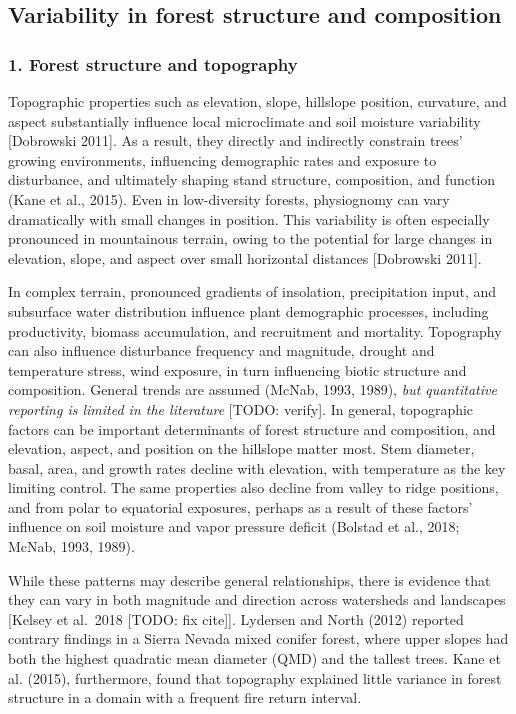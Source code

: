 \documentclass[
  12pt,
]{article}
\begin{document}
\hypertarget{variability-in-forest-structure-and-composition}{%
\subsection{Variability in forest structure and
composition}\label{variability-in-forest-structure-and-composition}}

\hypertarget{forest-structure-and-topography}{%
\subsubsection{1. Forest structure and
topography}\label{forest-structure-and-topography}}

Topographic properties such as elevation, slope, hillslope position,
curvature, and aspect substantially influence local microclimate and
soil moisture variability {[}Dobrowski 2011{]}. As a result, they
directly and indirectly constrain trees' growing environments,
influencing demographic rates and exposure to disturbance, and
ultimately shaping stand structure, composition, and function (Kane et
al., 2015). Even in low-diversity forests, physiognomy can vary
dramatically with small changes in position. This variability is often
especially pronounced in mountainous terrain, owing to the potential for
large changes in elevation, slope, and aspect over small horizontal
distances {[}Dobrowski 2011{]}.

In complex terrain, pronounced gradients of insolation, precipitation
input, and subsurface water distribution influence plant demographic
processes, including productivity, biomass accumulation, and recruitment
and mortality. Topography can also influence disturbance frequency and
magnitude, drought and temperature stress, wind exposure, in turn
influencing biotic structure and composition. General trends are assumed
(McNab, 1993, 1989), \emph{but quantitative reporting is limited in the
literature} {[}TODO: verify{]}. In general, topographic factors can be
important determinants of forest structure and composition, and
elevation, aspect, and position on the hillslope matter most. Stem
diameter, basal, area, and growth rates decline with elevation, with
temperature as the key limiting control. The same properties also
decline from valley to ridge positions, and from polar to equatorial
exposures, perhaps as a result of these factors' influence on soil
moisture and vapor pressure deficit (Bolstad et al., 2018; McNab, 1993,
1989).

While these patterns may describe general relationships, there is
evidence that they can vary in both magnitude and direction across
watersheds and landscapes {[}Kelsey et al.~2018 {[}TODO: fix cite{]}{]}.
Lydersen and North (2012) reported contrary findings in a Sierra Nevada
mixed conifer forest, where upper slopes had both the highest quadratic
mean diameter (QMD) and the tallest trees. Kane et al. (2015),
furthermore, found that topography explained little variance in forest
structure in a domain with a frequent fire return interval.
\end{document}
